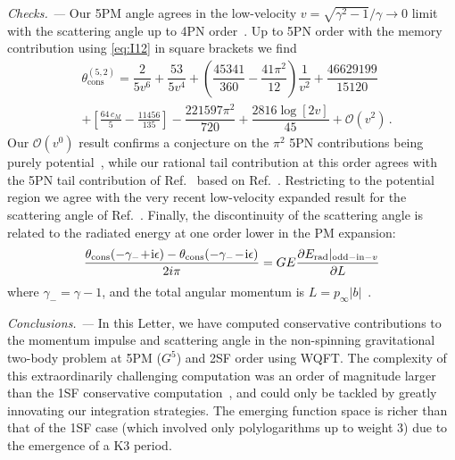 \documentclass[twocolumn,superscriptaddress,amsmath, amssymb, amsfonts,preprintnumbers,aps,prd,longbibliography,nofootinbib]{revtex4-2}
\renewcommand{\sec}[1]{\textit{#1. --- }}
\def\cO{\mathcal{O}}
\def\eps{\epsilon}
\renewcommand{\i}{\ensuremath{\mathrm{i}}}
\def\eps{\epsilon}
\def\Rcite#1{Ref.~\cite{#1}}
\newcommand{\pin}{p_{\infty}}
\begin{document}
\sec{Checks}
Our 5PM angle agrees in the low-velocity $v=\sqrt{\gamma^2-1}/\gamma\to0$ limit with the scattering
angle up to 4PN order~\cite{Bini:2020hmy,Blumlein:2020pog,Bini:2021gat,Bini:2022enm,Bini:2025vuk}.
Up to 5PN order with the memory contribution using \eqref{eq:I12}  in square brackets we find
\begin{align}

  &\theta^{(5,2)}_{\text{cons}}
  = \dfrac{2}{5 v^6}+\dfrac{53}{5 v^4}+ \left (\dfrac{45341}{360}-\dfrac{41 \pi^2}{12}\right )\dfrac{1}{v^{2}}  + \dfrac{46629199}{15120}\nonumber \\ &
   + \left [ \frac{64 \,c_{M}}{5}-\frac{11456}{135} \right ]-\dfrac{221597 \pi ^2}{720} + \dfrac{2816 \log[2v]}{45}
+\mathcal{O}(v^2)
 \, .

  \end{align}
Our $\cO(v^{0})$ result confirms a conjecture on the $\pi^{2}$ 5PN contributions
being purely potential~\cite{Blumlein:2020pyo,Bini:2025vuk}, while our rational
tail contribution at this order  agrees with the 5PN tail contribution of
\Rcite{PortoPrivate} based on \Rcite{Porto:2024cwd}.
Restricting to the potential region we agree with the very recent low-velocity expanded result for the scattering angle of \Rcite{Bern:2025wyd}.
Finally, the discontinuity of the scattering angle is related to the radiated energy at one order lower in the PM expansion:
\begin{align}\label{eq:discontinuity}
    \frac{\theta_{\rm cons}(-\gamma_{-}\!+\!\i\eps)-\theta_{\rm cons}(-\gamma_{-} \! -\! \i\eps)}{2i\pi}
    =
      G E
      \frac{\partial E_{\rm rad}|_{{\rm odd-in-}v}}{
        \partial L
      }

  \end{align}
where $\gamma_-=\gamma-1$,  and the total angular
momentum is $L=\pin |b|$~\cite{Cho:2021arx,Dlapa:2021vgp,Jakobsen:2023hig,Jakobsen:2023pvx,Bini:2017wfr}.



\sec{Conclusions}
In this Letter, we have {computed conservative contributions
to the momentum impulse and scattering angle}
in the non-spinning gravitational two-body problem
at {5PM ($G^{5}$) and 2SF} order using WQFT.
The complexity of this extraordinarily challenging computation
{was an order of magnitude larger than the 1SF conservative computation~\cite{Driesse:2024xad},}
and could only be tackled by greatly innovating our integration strategies.
The emerging function space is richer than {that of the 1SF case
(which involved only polylogarithms up to weight 3)
due to the emergence of a K3 period.}
\end{document}
